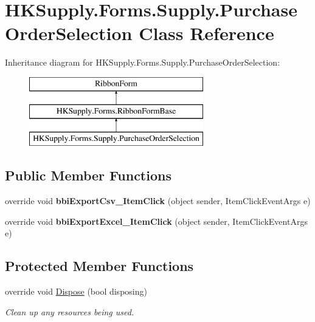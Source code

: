 \hypertarget{class_h_k_supply_1_1_forms_1_1_supply_1_1_purchase_order_selection}{}\section{H\+K\+Supply.\+Forms.\+Supply.\+Purchase\+Order\+Selection Class Reference}
\label{class_h_k_supply_1_1_forms_1_1_supply_1_1_purchase_order_selection}
Inheritance diagram for H\+K\+Supply.\+Forms.\+Supply.\+Purchase\+Order\+Selection\+:\begin{figure}[H]
\begin{center}
\leavevmode
\includegraphics[height=3.000000cm]{class_h_k_supply_1_1_forms_1_1_supply_1_1_purchase_order_selection}
\end{center}
\end{figure}
\subsection*{Public Member Functions}
\begin{DoxyCompactItemize}
\item 
\mbox{\label{class_h_k_supply_1_1_forms_1_1_supply_1_1_purchase_order_selection_af05caa366cd71b7dc9e10bf8f7ab0074}} 
override void {\bfseries bbi\+Export\+Csv\+\_\+\+Item\+Click} (object sender, Item\+Click\+Event\+Args e)
\item 
\mbox{\label{class_h_k_supply_1_1_forms_1_1_supply_1_1_purchase_order_selection_a410a11f29ca427b7e11e07514b531ae5}} 
override void {\bfseries bbi\+Export\+Excel\+\_\+\+Item\+Click} (object sender, Item\+Click\+Event\+Args e)
\end{DoxyCompactItemize}
\subsection*{Protected Member Functions}
\begin{DoxyCompactItemize}
\item 
override void \mbox{\hyperlink{class_h_k_supply_1_1_forms_1_1_supply_1_1_purchase_order_selection_a6e9e2c2955ebc43f9f9eace05ce13a80}{Dispose}} (bool disposing)
\begin{DoxyCompactList}\small\item\em Clean up any resources being used. \end{DoxyCompactList}\end{DoxyCompactItemize}
